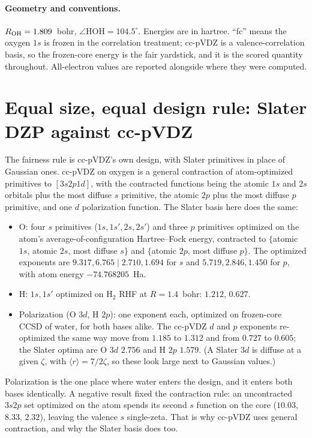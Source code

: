 \documentclass[aps,pra,twocolumn,superscriptaddress,longbibliography]{revtex4-2}
\begin{document}
\paragraph{Geometry and conventions.}  $R_{\rm OH}=1.809$~bohr,
$\angle\mathrm{HOH}=104.5^{\circ}$.  Energies are in hartree.  ``fc''
means the oxygen $1s$ is frozen in the correlation treatment; cc-pVDZ is
a valence-correlation basis, so the frozen-core energy is the fair
yardstick, and it is the scored quantity throughout.  All-electron
values are reported alongside where they were computed.

\section{Equal size, equal design rule: Slater DZP against cc-pVDZ}
\label{sec:dzp}

The fairness rule is cc-pVDZ's own design, with Slater primitives in
place of Gaussian ones.  cc-pVDZ on oxygen is a general contraction of
atom-optimized primitives to $[3s2p1d]$, with the contracted functions
being the atomic $1s$ and $2s$ orbitals plus the most diffuse $s$
primitive, the atomic $2p$ plus the most diffuse $p$ primitive, and one
$d$ polarization function.  The Slater basis here does the same:
\begin{itemize}
\item O: four $s$ primitives ($1s,1s',2s,2s'$) and three $p$ primitives
optimized on the atom's average-of-configuration Hartree--Fock energy,
contracted to $\{$atomic $1s$, atomic $2s$, most diffuse $s\}$ and
$\{$atomic $2p$, most diffuse $p\}$.  The optimized exponents are
$9.317, 6.765 \mid 2.710, 1.694$ for $s$ and $5.719, 2.846, 1.450$ for
$p$, with atom energy $-74.768205$~Ha.
\item H: $1s,1s'$ optimized on H$_2$ RHF at $R=1.4$~bohr: $1.212$,
$0.627$.
\item Polarization (O $3d$, H $2p$): one exponent each, optimized on
frozen-core CCSD of water, for both bases alike.  The cc-pVDZ $d$ and
$p$ exponents re-optimized the same way move from $1.185$ to $1.312$ and
from $0.727$ to $0.605$; the Slater optima are O $3d$ $2.756$ and H
$2p$ $1.579$.  (A Slater $3d$ is diffuse at a given $\zeta$, with
$\langle r\rangle=7/2\zeta$, so these look large next to Gaussian
values.)
\end{itemize}
Polarization is the one place where water enters the design, and it
enters both bases identically.  A negative result fixed the contraction
rule: an uncontracted $3s2p$ set optimized on the atom spends its
second $s$ function on the core ($10.03$, $8.33$, $2.32$), leaving the
valence $s$ single-zeta.  That is why cc-pVDZ uses general contraction,
and why the Slater basis does too.
\end{document}
